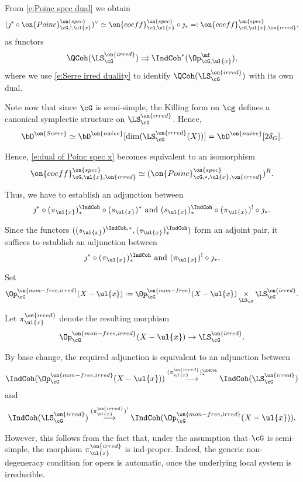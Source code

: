 \documentclass[9pt]{amsart}
\theoremstyle{remark}
\theoremstyle{definition}
\theoremstyle{remark}
\numberwithin{equation}{section}
\begin{document}
From \eqref{e:Poinc spec dual} we obtain 
$$(\jmath^*\circ \on{Poinc}^{\on{spec}}_{\cG,!,\ul{x}})^\vee \simeq \on{coeff}^{\on{spec}}_{\cG,\ul{x}}\circ \jmath_*=:
\on{coeff}^{\on{spec}}_{\cG,\ul{x},\on{irred}},$$
as functors 
$$\QCoh(\LS^{\on{irred}}_\cG)\rightrightarrows \IndCoh^*(\Op^\mf_{\cG,\ul{x}}),$$
where we use \eqref{e:Serre irred duality} to identify $\QCoh(\LS^{\on{irred}}_\cG)$ with its own dual.

\sssec{}

Note now that since $\cG$ is semi-simple, the Killing form on $\cg$ defines a canonical symplectic structure on 
$\LS^{\on{irred}}_\cG$. Hence, 
$$\bD^{\on{Serre}} \simeq \bD^{\on{naive}}[\dim(\LS_\cG^{\on{irred}}(X))]= \bD^{\on{naive}}[2\delta_G].$$

Hence, \eqref{e:dual of Poinc spec x} becomes equivalent to an isomorphism
\begin{equation} \label{e:Poinc spec adj}
\on{coeff}^{\on{spec}}_{\cG,\ul{x},\on{irred}}\simeq (\on{Poinc}^{\on{spec}}_{\cG,*,\ul{x},\on{irred}})^R.
\end{equation} 

\sssec{}

Thus, we have to establish an adjunction between 
$$\jmath^*\circ (\pi_{\ul{x}})^{\IndCoh}_*\circ (s_{\ul{x}})^* \text{ and } (s_{\ul{x}})^{\IndCoh}_*\circ (\pi_{\ul{x}})^!\circ \jmath_*.$$

Since the functors $((s_{\ul{x}})^{\IndCoh,*},(s_{\ul{x}})^{\IndCoh}_*)$ form an adjoint pair, it suffices to establish an adjunction between
$$\jmath^*\circ (\pi_{\ul{x}})^{\IndCoh}_* \text{ and } (\pi_{\ul{x}})^!\circ \jmath_*.$$

\sssec{} \label{sss:ind-proper}

Set
$$\Op^{\on{mon-free,irred}}_\cG(X-\ul{x}):=\Op^{\on{mon-free}}_\cG(X-\ul{x})\underset{\LS_\cG}\times
\LS^{\on{irred}}_\cG.$$

Let $\pi^{\on{irred}}_{\ul{x}}$ denote the resulting morphism 
$$\Op^{\on{mon-free,irred}}_\cG(X-\ul{x})\to \LS^{\on{irred}}_\cG.$$

By base change, the required adjunction is equivalent to an adjunction between
$$\IndCoh(\Op^{\on{mon-free,irred}}_\cG(X-\ul{x})) \overset{(\pi^{\on{irred}}_{\ul{x}})^{\IndCoh}_*}\longrightarrow \IndCoh(\LS^{\on{irred}}_\cG)$$
and
$$\IndCoh(\LS^{\on{irred}}_\cG)
\overset{(\pi^{\on{irred}}_{\ul{x}})^!}\longrightarrow \IndCoh(\Op^{\on{mon-free,irred}}_\cG(X-\ul{x})).$$

However, this follows from the fact that, under the assumption that $\cG$ is semi-simple, the morphism $\pi^{\on{irred}}_{\ul{x}}$
is ind-proper. Indeed, the generic non-degeneracy condition for opers 
is automatic, once the underlying local system is irreducible. 
\end{document}
